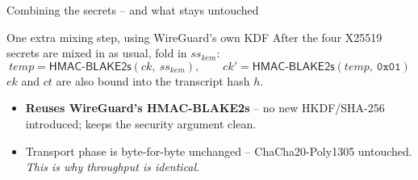 \documentclass[aspectratio=169,11pt]{beamer}
\newcommand{\sskem}{\ensuremath{ss_{\mathit{kem}}}}
\begin{document}
\begin{frame}{Combining the secrets -- and what stays untouched}
  \begin{block}{One extra mixing step, using WireGuard's own KDF}
    After the four X25519 secrets are mixed in as usual, fold in \sskem:
    \[
      temp = \mathsf{HMAC\text{-}BLAKE2s}(ck,\ \sskem),\qquad
      ck' = \mathsf{HMAC\text{-}BLAKE2s}(temp,\ \mathtt{0x01})
    \]
    $ek$ and $ct$ are also bound into the transcript hash $h$.
  \end{block}
  \vfill
  \begin{itemize}
    \item \textbf{Reuses WireGuard's HMAC-BLAKE2s} -- no new HKDF/SHA-256
          introduced; keeps the security argument clean.
    \item \alert{Transport phase is byte-for-byte unchanged} -- ChaCha20-Poly1305
          untouched. \emph{This is why throughput is identical.}
  \end{itemize}
\end{frame}
\end{document}
